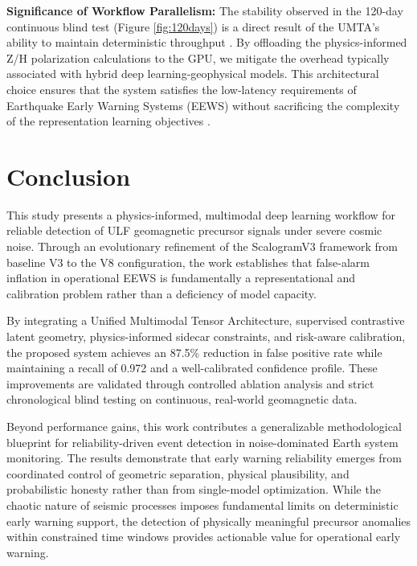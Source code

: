 \documentclass[a4paper,fleqn]{cas-sc}
\begin{document}
\noindent \textbf{Significance of Workflow Parallelism:} The stability observed in the 120-day continuous blind test (Figure \ref{fig:120days}) is a direct result of the UMTA's ability to maintain deterministic throughput \cite{Mahmud2025ConTraPh,Ouyang2023Parallel}. By offloading the physics-informed Z/H polarization calculations to the GPU, we mitigate the overhead typically associated with hybrid deep learning-geophysical models. This architectural choice ensures that the system satisfies the low-latency requirements of Earthquake Early Warning Systems (EEWS) without sacrificing the complexity of the representation learning objectives \cite{Ouyang2023Parallel,Ganguly2024JPDC}.


\section{Conclusion}

This study presents a physics-informed, multimodal deep learning workflow for reliable detection of ULF geomagnetic precursor signals under severe cosmic noise. Through an evolutionary refinement of the ScalogramV3 framework from baseline V3 to the V8 configuration, the work establishes that false-alarm inflation in operational EEWS is fundamentally a representational and calibration problem rather than a deficiency of model capacity.

By integrating a Unified Multimodal Tensor Architecture, supervised contrastive latent geometry, physics-informed sidecar constraints, and risk-aware calibration, the proposed system achieves an 87.5\% reduction in false positive rate while maintaining a recall of 0.972 and a well-calibrated confidence profile. These improvements are validated through controlled ablation analysis and strict chronological blind testing on continuous, real-world geomagnetic data.

Beyond performance gains, this work contributes a generalizable methodological blueprint for reliability-driven event detection in noise-dominated Earth system monitoring. The results demonstrate that early warning reliability emerges from coordinated control of geometric separation, physical plausibility, and probabilistic honesty rather than from single-model optimization. While the chaotic nature of seismic processes imposes fundamental limits on deterministic early warning support, the detection of physically meaningful precursor anomalies within constrained time windows provides actionable value for operational early warning.
\end{document}

